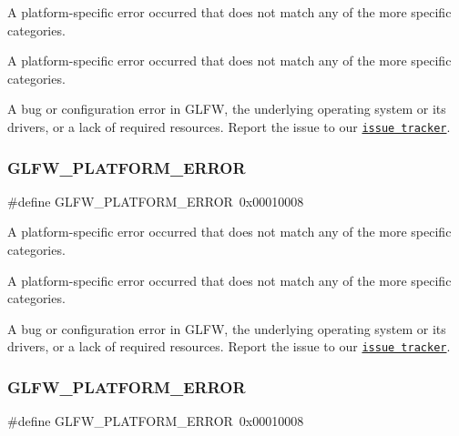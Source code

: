 A platform-\/specific error occurred that does not match any of the more specific categories. 

A platform-\/specific error occurred that does not match any of the more specific categories.

A bug or configuration error in G\+L\+FW, the underlying operating system or its drivers, or a lack of required resources. Report the issue to our \href{https://github.com/glfw/glfw/issues}{\tt issue tracker}. \mbox{\label{group__errors_gad44162d78100ea5e87cdd38426b8c7a1}} 
\subsubsection{\texorpdfstring{G\+L\+F\+W\+\_\+\+P\+L\+A\+T\+F\+O\+R\+M\+\_\+\+E\+R\+R\+OR}{GLFW\_PLATFORM\_ERROR}\hspace{0.1cm}{\footnotesize\ttfamily [3/5]}}
{\footnotesize\ttfamily \#define G\+L\+F\+W\+\_\+\+P\+L\+A\+T\+F\+O\+R\+M\+\_\+\+E\+R\+R\+OR~0x00010008}



A platform-\/specific error occurred that does not match any of the more specific categories. 

A platform-\/specific error occurred that does not match any of the more specific categories.

A bug or configuration error in G\+L\+FW, the underlying operating system or its drivers, or a lack of required resources. Report the issue to our \href{https://github.com/glfw/glfw/issues}{\tt issue tracker}. \mbox{\label{group__errors_gad44162d78100ea5e87cdd38426b8c7a1}} 
\subsubsection{\texorpdfstring{G\+L\+F\+W\+\_\+\+P\+L\+A\+T\+F\+O\+R\+M\+\_\+\+E\+R\+R\+OR}{GLFW\_PLATFORM\_ERROR}\hspace{0.1cm}{\footnotesize\ttfamily [4/5]}}
{\footnotesize\ttfamily \#define G\+L\+F\+W\+\_\+\+P\+L\+A\+T\+F\+O\+R\+M\+\_\+\+E\+R\+R\+OR~0x00010008}



